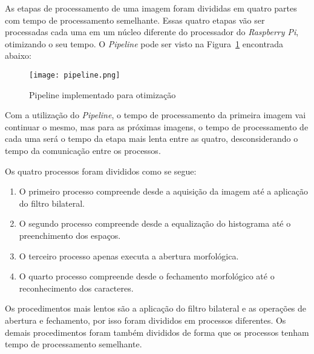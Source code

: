 As etapas de processamento de uma imagem foram divididas em quatro partes com
tempo de processamento semelhante. Essas quatro etapas vão ser processadas cada
uma em um núcleo diferente do processador do \emph{Raspberry Pi}, otimizando o
seu tempo. O \emph{Pipeline} pode ser visto na Figura~\ref{fig:pipeline}
encontrada abaixo:

\begin{figure}[H]
	\centering
	\texttt{[image: pipeline.png]}
	\caption{Pipeline implementado para otimização}
	\label{fig:pipeline}
\end{figure}

Com a utilização do \emph{Pipeline}, o tempo de processamento da primeira imagem
vai continuar o mesmo, mas para as próximas imagens, o tempo de processamento de
cada uma será o tempo da etapa mais lenta entre as quatro, desconsiderando o
tempo da comunicação entre os processos.

Os quatro processos foram divididos como se segue:

\begin{enumerate}
	\item O primeiro processo compreende desde a aquisição da imagem até a aplicação do filtro bilateral.
	\item O segundo processo compreende desde a equalização do histograma até o preenchimento dos espaços.
	\item O terceiro processo apenas executa a abertura morfológica.
	\item O quarto processo compreende desde o fechamento morfológico até o reconhecimento dos caracteres.
\end{enumerate}

Os procedimentos mais lentos são a aplicação do filtro bilateral e as operações
de abertura e fechamento, por isso foram divididos em processos diferentes. Os
demais procedimentos foram também divididos de forma que os processos tenham
tempo de processamento semelhante.


